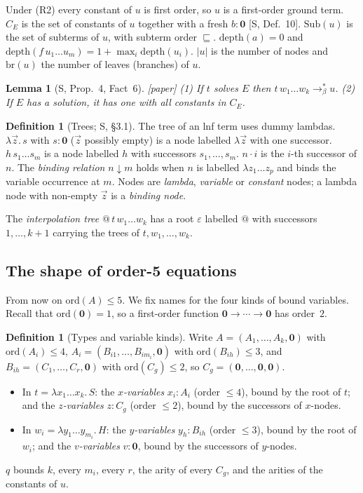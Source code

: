 \documentclass[11pt]{article}
\newcommand{\Ground}{\mathbf{0}}
\newcommand{\ord}{\mathrm{ord}}
\newcommand{\Sub}{\mathrm{Sub}}
\newcommand{\depth}{\mathrm{depth}}
\newcommand{\br}{\mathrm{br}}
\newcommand{\bnd}{\mathrel{\downarrow}}
\newcommand{\suc}[2]{#1{\cdot}#2}
\newcommand{\CE}{C_E}
\newcommand{\sq}{\sqsubseteq}
\newcommand{\Paper}{\textsf{[paper]}}
\theoremstyle{plain}
\newtheorem{lemma}[theorem]{Lemma}
\theoremstyle{definition}
\newtheorem{definition}[theorem]{Definition}
\theoremstyle{remark}
\begin{document}
Under (R2) every constant of $u$ is first order, so $u$ is a first-order
ground term.  $\CE$ is the set of constants of $u$ together with a fresh
$b:\Ground$ [S, Def.~10].  $\Sub(u)$ is the set of subterms of $u$, with
subterm order $\sq$.  $\depth(a)=0$ and
$\depth(f\,u_1\dots u_m)=1+\max_i\depth(u_i)$.  $|u|$ is the number of
nodes and $\br(u)$ the number of leaves (branches) of $u$.

\begin{lemma}[S, Prop.~4, Fact~6]\label{lem:reduces}
\Paper{} (1) If $t$ solves $E$ then $t\,w_1\dots w_k\to_\beta^*u$.
(2) If $E$ has a solution, it has one with all constants in $\CE$.
\end{lemma}

\begin{definition}[Trees; S, \S3.1]
The tree of an lnf term uses dummy lambdas.  $\lambda\vec z.\,s$ with
$s:\Ground$ ($\vec z$ possibly empty) is a node labelled $\lambda\vec z$
with one successor.  $h\,s_1\dots s_m$ is a node labelled $h$ with
successors $s_1,\dots,s_m$.  $\suc ni$ is the $i$-th successor of $n$.
The \emph{binding relation} $n\bnd m$ holds when $n$ is labelled
$\lambda z_1\dots z_p$ and binds the variable occurrence at $m$.  Nodes
are \emph{lambda}, \emph{variable} or \emph{constant} nodes; a lambda
node with non-empty $\vec z$ is a \emph{binding node}.

The \emph{interpolation tree} $@\,t\,w_1\dots w_k$ has a root
$\varepsilon$ labelled $@$ with successors $1,\dots,k+1$ carrying the
trees of $t,w_1,\dots,w_k$.
\end{definition}

\subsection{The shape of order-5 equations}\label{sec:shape}

From now on $\ord(A)\le5$.  We fix names for the four kinds of bound
variables.  Recall that $\ord(\Ground)=1$, so a first-order function
$\Ground\to\cdots\to\Ground$ has order~$2$.

\begin{definition}[Types and variable kinds]\label{def:kinds}
Write $A=(A_1,\dots,A_k,\Ground)$ with $\ord(A_i)\le4$,
$A_i=(B_{i1},\dots,B_{im_i},\Ground)$ with $\ord(B_{ih})\le3$, and
$B_{ih}=(C_1,\dots,C_r,\Ground)$ with $\ord(C_g)\le2$, so
$C_g=(\Ground,\dots,\Ground,\Ground)$.
\begin{itemize}
\item In $t=\lambda x_1\dots x_k.\,S$: the \emph{$x$-variables}
  $x_i:A_i$ (order $\le4$), bound by the root of $t$; and the
  \emph{$z$-variables} $z:C_g$ (order $\le2$), bound by the successors
  of $x$-nodes.
\item In $w_i=\lambda y_1\dots y_{m_i}.\,H$: the \emph{$y$-variables}
  $y_h:B_{ih}$ (order $\le3$), bound by the root of $w_i$; and the
  \emph{$v$-variables} $v:\Ground$, bound by the successors of
  $y$-nodes.
\end{itemize}
$q$ bounds $k$, every $m_i$, every $r$, the arity of every $C_g$, and
the arities of the constants of $u$.
\end{definition}
\end{document}
